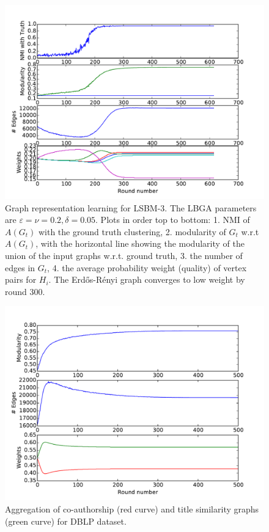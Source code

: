 \documentclass{article}
\newcommand{\er}{Erd\H{o}s-R\'{e}nyi }
\begin{document}
\begin{figure}[t]
\begin{centering}
\includegraphics[width=\columnwidth]{LBM-SNR=6+ER-consistentNO+NEF.pdf}
\par\end{centering}
\caption{Graph representation learning for LSBM-3. The LBGA parameters are
$\varepsilon=\nu=0.2, \delta=0.05$. Plots in order top to bottom: 1. NMI of
$A(G_t)$ with the ground truth clustering, 2. modularity of $G_t$ w.r.t
$A(G_t)$, with the horizontal line showing the modularity of the union of the
input graphs w.r.t. ground truth, 3. the number of edges in $G_t$, 4.  the
average probability weight (quality) of vertex pairs for $H_i$.  The \er graph
converges to low weight by round 300.} 
\label{fig:local-sbm} 
\end{figure}

\begin{figure}[t]
\begin{centering}
\includegraphics[width=\columnwidth]{DBLP-consistentNO+NEF.pdf}
\par\end{centering}
\caption{Aggregation of co-authorship (red curve) and title similarity graphs
(green curve) for DBLP dataset.} 
\label{fig:dblp}
\end{figure}
\end{document}
